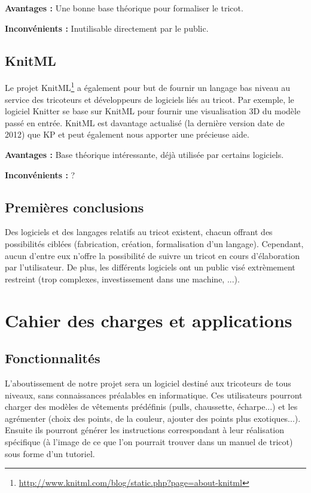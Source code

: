 \documentclass{article}
\begin{document}
\textbf{Avantages : } Une bonne base théorique pour formaliser le tricot.

\textbf{Inconvénients : } Inutilisable directement par le public.

\subsection{KnitML}

Le projet KnitML\footnote{\url{http://www.knitml.com/blog/static.php?page=about-knitml}} a également pour but de fournir un langage bas 
niveau au service des tricoteurs et développeurs de logiciels liés au tricot. Par exemple, le logiciel Knitter se base sur KnitML pour 
fournir une visualisation 3D du modèle passé en entrée. KnitML est davantage actualisé (la dernière version date de 2012) que KP et peut 
également nous apporter une précieuse aide.

\textbf{Avantages : } Base théorique intéressante, déjà utilisée par certains logiciels.

\textbf{Inconvénients : } ? %

\subsection{Premières conclusions}

Des logiciels et des langages relatifs au tricot existent, chacun offrant des possibilités ciblées (fabrication, création, formalisation 
d'un langage). Cependant, aucun d'entre eux n'offre la possibilité de suivre un tricot en cours d'élaboration par l'utilisateur. De plus, 
les différents logiciels ont un public visé extrèmement restreint (trop complexes, investissement dans une machine, ...).

\section{Cahier des charges et applications}

\subsection{Fonctionnalités}

L'aboutissement de notre projet sera un logiciel destiné aux tricoteurs de tous niveaux, sans connaissances préalables en informatique. 
Ces utilisateurs pourront charger des modèles de vêtements prédéfinis (pulls, chaussette, écharpe...) et les agrémenter (choix des points, 
de la couleur, ajouter des points plus exotiques...). Ensuite ils pourront générer les instructions correspondant à leur réalisation 
spécifique (à l'image de ce que l'on pourrait trouver dans un manuel de tricot) sous forme d'un tutoriel.
\end{document}
